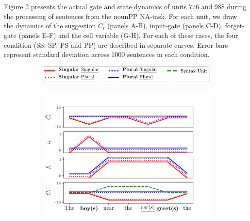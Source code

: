 Figure 2 presents the actual gate and state dynamics of units 776 and 988 during the processing of sentences from the nounPP NA-task. 
For each unit, we draw the dynamics of the suggestion $\tilde{C}_t$ (panels A-B), input-gate (panels C-D), forget-gate (panels E-F) and the cell variable (G-H). 
For each of these cases, the four condition (SS, SP, PS and PP) are described in separate curves. 
Error-bars represent standard deviation across 1000 sentences in each condition.

\begin{figure}[ht]
    \centering
    \begin{subfigure}{\textwidth}
            \centering
            \includegraphics[width=0.3\linewidth]{Figures/legend.pdf}
    \end{subfigure}
    \bigskip
    \begin{subfigure}{0.3\textwidth}
            \centering
            \includegraphics[width=\linewidth]{Figures/unit-timeseries-cartoon.pdf}
    \label{fig:unit-timeseries-cartoon}
    \end{subfigure}
    \begin{subfigure}{0.3\textwidth}
            \centering

\end{subfigure}
\end{figure}
